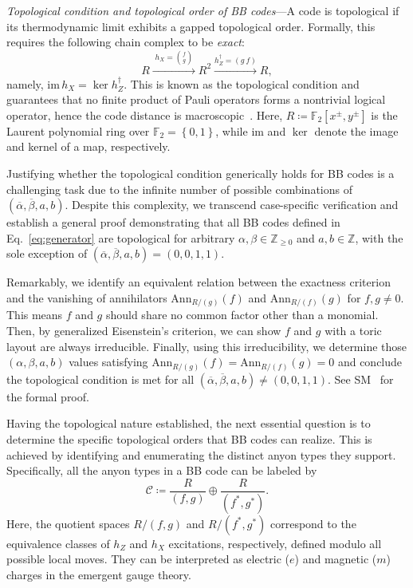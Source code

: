 \documentclass[aps,prl,english,superscriptaddress,twocolumn,tightenlines,showpacs,longbibliography,floatfix,amsfonts]{revtex4-2}
\begin{document}
	
	\emph{Topological condition and topological order of BB codes}---A code is topological if its thermodynamic limit exhibits a gapped topological order.
	Formally, this requires the following chain complex to be \emph{exact}:
	\begin{equation}\label{eq:chain}
		R\xrightarrow{\; h_{X}={f \choose g}\;}R^{2}\xrightarrow{h_{Z}^{\dagger}=\left(g\ f\right)}R,
	\end{equation}
	namely, $\text{im}\,h_{X}=\ker h_{Z}^{\dagger}$.
	This is known as the topological condition and guarantees that no finite product of Pauli operators forms a nontrivial logical operator, hence the code distance is macroscopic~\cite{Haah13,Haah13_thesis}.
	Here, $R\coloneqq\mathbb{F}_{2}[x^{\pm},y^{\pm}]$ is the Laurent polynomial ring over $\mathbb{F}_{2}=\left\{ 0,1\right\} $, while $\text{im}$ and $\ker$ denote the image and kernel of a map, respectively.
	
	
	Justifying whether the topological condition generically holds for BB codes is a challenging task due to the infinite number of possible combinations of $(\overline{\alpha}, \overline{\beta}, a, b)$.
	Despite this complexity, we transcend case-specific verification and establish a general proof demonstrating that all BB codes defined in Eq.~\eqref{eq:generator} are topological for arbitrary $\alpha,\beta\in\mathbb{Z}_{\geq0}$ and $a,b\in\mathbb{Z}$, with the sole exception of $(\overline{\alpha}, \overline{\beta}, a, b) = (0,0,1,1)$. 
	
	Remarkably, we identify an equivalent relation between the exactness criterion and the vanishing of annihilators $\mathrm{Ann}_{R/\left(g\right)}\left(f\right)$ and $\mathrm{Ann}_{R/\left(f\right)}\left(g\right)$ for $f,g \neq 0$.
	This means $f$ and $g$ should share no common factor other than a monomial.
	Then, by generalized Eisenstein's criterion, we can show $f$ and $g$ with a toric layout are always irreducible.
	Finally, using this irreducibility, we determine those $\left(\alpha,\beta,a,b\right)$ values satisfying $\mathrm{Ann}_{R/\left(g\right)}\left(f\right)=\mathrm{Ann}_{R/\left(f\right)}\left(g\right)=0$ and conclude the topological condition is met for all $(\overline{\alpha}, \overline{\beta}, a, b) \neq (0,0,1,1)$.
	See SM~\cite{SM1} for the formal proof.
	
	
	
	Having the topological nature established, the next essential question is to determine the specific topological orders that BB codes can realize. This is achieved by identifying and enumerating the distinct anyon types they support. Specifically, all the anyon types in a BB code can be labeled by
	\begin{equation} \label{eq:C}
		\mathscr{C}\coloneqq\frac{R}{\left(f,g\right)}\oplus\frac{R}{(f^\ast,g^\ast)}.
	\end{equation}
	Here, the quotient spaces $R/(f,g)$ and $R/(f^\ast,g^\ast)$ correspond to the equivalence classes of $h_Z$ and $h_X$ excitations, respectively, defined modulo all possible local moves. They can be interpreted as electric ($e$) and magnetic ($m$) charges in the emergent gauge theory. 
	
\end{document}
